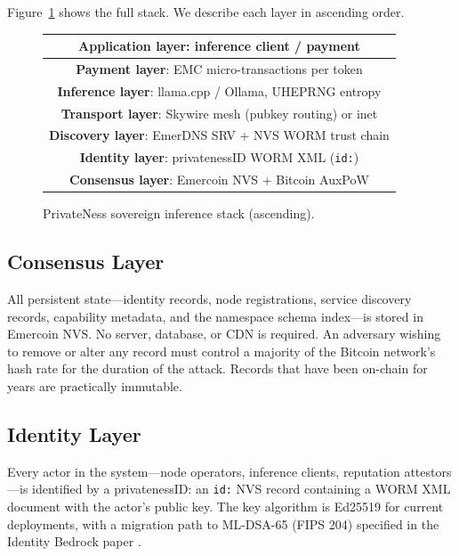 \documentclass[11pt,a4paper]{article}
\theoremstyle{definition}
\begin{document}
Figure~\ref{fig:layers} shows the full stack.  We describe each layer in
ascending order.

\begin{figure}[ht]
\begin{center}
\begin{tabular}{|c|}
\hline
\rule{0pt}{2.2ex}\textbf{Application layer}: inference client / payment \\
\hline
\rule{0pt}{2.2ex}\textbf{Payment layer}: EMC micro-transactions per token \\
\hline
\rule{0pt}{2.2ex}\textbf{Inference layer}: llama.cpp / Ollama, UHEPRNG entropy \\
\hline
\rule{0pt}{2.2ex}\textbf{Transport layer}: Skywire mesh (pubkey routing) or inet \\
\hline
\rule{0pt}{2.2ex}\textbf{Discovery layer}: EmerDNS SRV + NVS WORM trust chain \\
\hline
\rule{0pt}{2.2ex}\textbf{Identity layer}: privatenessID WORM XML (\texttt{id:}) \\
\hline
\rule{0pt}{2.2ex}\textbf{Consensus layer}: Emercoin NVS + Bitcoin AuxPoW \\
\hline
\end{tabular}
\end{center}
\caption{PrivateNess sovereign inference stack (ascending).}
\label{fig:layers}
\end{figure}

\subsection{Consensus Layer}

All persistent state---identity records, node registrations, service discovery
records, capability metadata, and the namespace schema index---is stored in
Emercoin NVS.  No server, database, or CDN is required.  An adversary wishing
to remove or alter any record must control a majority of the Bitcoin network's
hash rate for the duration of the attack.  Records that have been on-chain for
years are practically immutable.

\subsection{Identity Layer}

Every actor in the system---node operators, inference clients, reputation
attestors---is identified by a privatenessID: an \texttt{id:} NVS record
containing a WORM XML document with the actor's public key.  The key algorithm
is Ed25519 for current deployments, with a migration path to ML-DSA-65 (FIPS
204) specified in the Identity Bedrock paper \cite{identitybedrock}.
\end{document}
